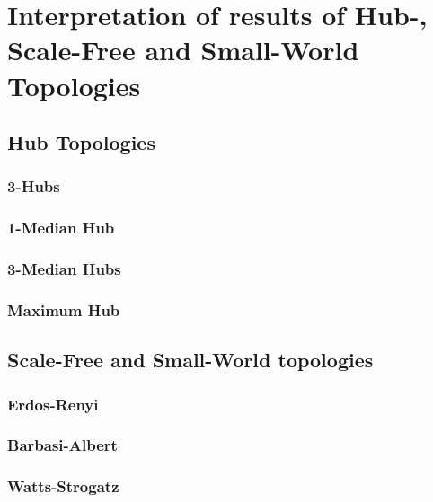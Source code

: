 \documentclass[Bachelorarbeit.tex]{subfiles}
\begin{document}
\chapter{Interpretation of results of Hub-, Scale-Free and Small-World Topologies}

\section{Hub Topologies}
\subsection{3-Hubs}
\subsection{1-Median Hub}
\subsection{3-Median Hubs}
\subsection{Maximum Hub}

\section{Scale-Free and Small-World topologies}
\subsection{Erdos-Renyi}
\subsection{Barbasi-Albert}
\subsection{Watts-Strogatz}
\end{document}
